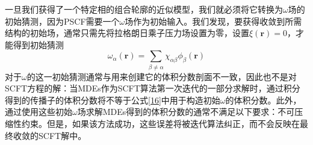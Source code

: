 \documentclass[12pt,a4paper]{article}
\begin{document}
一旦我们获得了一个特定相的组合轮廓的近似模型，我们就必须将它转换为$\omega$场的初始猜测，因为PSCF需要一个$\omega$场作为初始输入。我们发现，要获得收敛到所需结构的初始场，通常只需先将拉格朗日乘子压力场设置为零，设置$\xi(\mathbf{r})=0$，才能得到初始猜测
\begin{equation}\label{16}
\omega _{\alpha}(\mathbf{r})=\sum _{\beta \neq \alpha} \chi _{\alpha \beta} \phi _{\beta}(\mathbf{r})
\end{equation}
对于$\omega$的这一初始猜测通常与用来创建它的体积分数剖面不一致，因此也不是对SCFT方程的解：当MDEs作为SCFT算法第一次迭代的一部分求解时，通过积分得到的传播子的体积分数将不等于公式\ref{16}中用于构造初始$\omega$的体积分数。此外，通过使用这些初始$\omega$场求解MDEs得到的体积分数的通常不满足以下要求：不可压缩性约束。但是，如果该方法成功，这些误差将被迭代算法纠正，而不会反映在最终收敛的SCFT解中。
\end{document}

